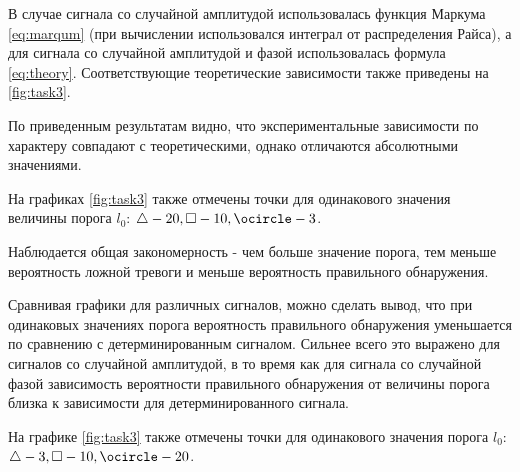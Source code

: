 В случае сигнала со случайной амплитудой использовалась функция Маркума \eqref{eq:marqum} 
(при вычислении использовался интеграл от распределения Райса), а для сигнала со случайной амплитудой и фазой
использовалась формула \eqref{eq:theory}. Соответствующие теоретические зависимости также приведены на \ref{fig:task3}.

По приведенным результатам видно, что экспериментальные зависимости по характеру совпадают с теоретическими,
однако отличаются абсолютными значениями.

На графиках \ref{fig:task3} также отмечены точки для одинакового значения величины порога $l_0$: $\triangle - 20, \square - 10, \ocircle - 3$.

Наблюдается общая закономерность - чем больше значение порога, тем меньше вероятность
ложной тревоги и меньше вероятность правильного обнаружения.

Сравнивая графики для 
различных сигналов, можно сделать вывод, что при одинаковых значениях порога вероятность правильного
обнаружения уменьшается по сравнению с детерминированным сигналом.
Сильнее всего это выражено для сигналов со случайной амплитудой, в то время как для сигнала
со случайной фазой зависимость вероятности правильного обнаружения от величины порога близка
к зависимости для детерминированного сигнала.

На графике \ref{fig:task3} также отмечены точки для одинакового значения порога $l_0$: $\triangle - 3, \square - 10, \ocircle - 20$.

